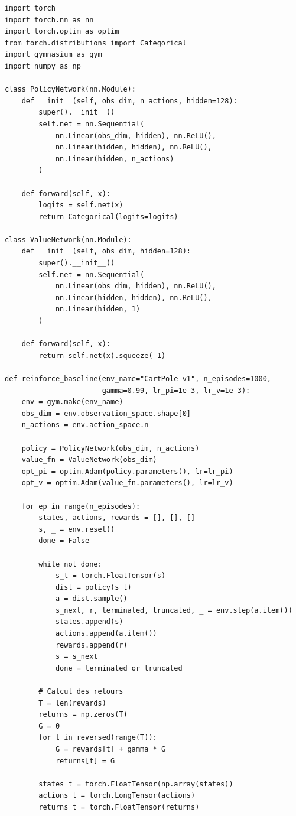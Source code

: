 \begin{codeblock}[title=\textbf{REINFORCE avec ligne de base}]
\begin{verbatim}
import torch
import torch.nn as nn
import torch.optim as optim
from torch.distributions import Categorical
import gymnasium as gym
import numpy as np

class PolicyNetwork(nn.Module):
    def __init__(self, obs_dim, n_actions, hidden=128):
        super().__init__()
        self.net = nn.Sequential(
            nn.Linear(obs_dim, hidden), nn.ReLU(),
            nn.Linear(hidden, hidden), nn.ReLU(),
            nn.Linear(hidden, n_actions)
        )

    def forward(self, x):
        logits = self.net(x)
        return Categorical(logits=logits)

class ValueNetwork(nn.Module):
    def __init__(self, obs_dim, hidden=128):
        super().__init__()
        self.net = nn.Sequential(
            nn.Linear(obs_dim, hidden), nn.ReLU(),
            nn.Linear(hidden, hidden), nn.ReLU(),
            nn.Linear(hidden, 1)
        )

    def forward(self, x):
        return self.net(x).squeeze(-1)

def reinforce_baseline(env_name="CartPole-v1", n_episodes=1000,
                       gamma=0.99, lr_pi=1e-3, lr_v=1e-3):
    env = gym.make(env_name)
    obs_dim = env.observation_space.shape[0]
    n_actions = env.action_space.n

    policy = PolicyNetwork(obs_dim, n_actions)
    value_fn = ValueNetwork(obs_dim)
    opt_pi = optim.Adam(policy.parameters(), lr=lr_pi)
    opt_v = optim.Adam(value_fn.parameters(), lr=lr_v)

    for ep in range(n_episodes):
        states, actions, rewards = [], [], []
        s, _ = env.reset()
        done = False

        while not done:
            s_t = torch.FloatTensor(s)
            dist = policy(s_t)
            a = dist.sample()
            s_next, r, terminated, truncated, _ = env.step(a.item())
            states.append(s)
            actions.append(a.item())
            rewards.append(r)
            s = s_next
            done = terminated or truncated

        # Calcul des retours
        T = len(rewards)
        returns = np.zeros(T)
        G = 0
        for t in reversed(range(T)):
            G = rewards[t] + gamma * G
            returns[t] = G

        states_t = torch.FloatTensor(np.array(states))
        actions_t = torch.LongTensor(actions)
        returns_t = torch.FloatTensor(returns)


\end{verbatim}
\end{codeblock}
